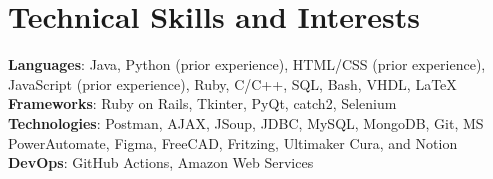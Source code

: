 \section{Technical Skills and Interests}
    \begin{itemize}[leftmargin=0.15in, label={}]
	\small{\item{
		\textbf{Languages}{: Java, Python (prior experience), HTML/CSS (prior experience), JavaScript (prior experience), Ruby, C/C++, SQL, Bash, VHDL, LaTeX} \\
		\textbf{Frameworks}{: Ruby on Rails, Tkinter, PyQt, catch2, Selenium} \\
		\textbf{Technologies}{: Postman, AJAX, JSoup, JDBC, MySQL, MongoDB, Git, MS PowerAutomate, Figma, FreeCAD, Fritzing, Ultimaker Cura, and Notion} \\
		\textbf{DevOps}{: GitHub Actions, Amazon Web Services} \\
	}}
    \end{itemize}
